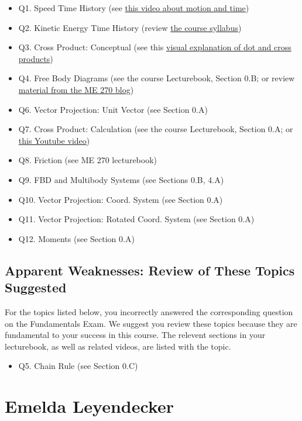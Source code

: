 \documentclass[11pt,letterpaper]{article}\usepackage[]{graphicx}\usepackage[]{color}
\begin{document}
\begin{itemize}\item Q1. Speed Time History (see \href{https://www.youtube.com/watch?v=lZPtFDXYQRU}{this video about motion and time})
\item Q2. Kinetic Energy Time History (review \href{https://www.purdue.edu/freeform/dynamics/wp-content/uploads/sites/4/2018/01/Syllabus-Spring-2018.pdf}{the course syllabus})
\item Q3. Cross Product: Conceptual (see this \href{https://www.youtube.com/watch?v=h0NJK4mEIJU&t=8s}{visual explanation of dot and cross products})
\item Q4. Free Body Diagrams (see the course Lecturebook, Section 0.B; or review \href{https://www.purdue.edu/statics/}{material from the ME 270 blog})
\item Q6. Vector Projection: Unit Vector (see Section 0.A)
\item Q7. Cross Product: Calculation (see the course Lecturebook, Section 0.A; or \href{https://www.youtube.com/watch?v=DmPxjmymM7k}{this Youtube video})
\item Q8. Friction (see ME 270 lecturebook)
\item Q9. FBD and Multibody Systems (see Sections 0.B, 4.A)
\item Q10. Vector Projection: Coord. System (see Section 0.A)
\item Q11. Vector Projection: Rotated Coord. System (see Section 0.A)
\item Q12. Moments (see Section 0.A)
\end{itemize}\subsection*{Apparent Weaknesses: Review of These Topics Suggested}
For the topics listed below, you incorrectly answered the corresponding question on the Fundamentals Exam.  We suggest you review these topics because they are fundamental to your success in this course.  The relevent sections in your lecturebook, as well as related videos, are listed with the topic.

\begin{itemize}\item Q5. Chain Rule (see Section 0.C)
\end{itemize}

\pagebreak
\section*{Emelda Leyendecker}
\end{document}
